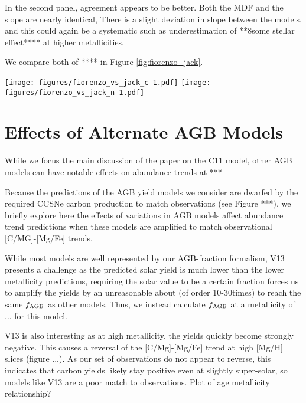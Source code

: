 \documentclass[fleqn,usenatbib]{mnras}
\begin{document}
In the second panel, agreement appears to be better. Both the MDF and the slope are nearly identical,
There is a slight deviation in slope between the models, and this could again be a systematic such as underestimation of **8some stellar effect**** at higher metallicities.

We compare both of **** in Figure \ref{fig:fiorenzo_jack}.


\begin{figure*}
    \centering
    \texttt{[image: figures/fiorenzo\_vs\_jack\_c-1.pdf]}
    \texttt{[image: figures/fiorenzo\_vs\_jack\_n-1.pdf]}
    \caption{A comparison of estimated stellar birth abundance trends from the subgiant sample and \citet{2021arXiv210603912V}
    }
    \label{fig:fiorenzo_jack}
\end{figure*}

\section{Effects of Alternate AGB Models}\label{sec:alt_agb}


While we focus the main discussion of the paper on the C11 model, other AGB models can have notable effects on abundance trends at ***

Because the predictions of the AGB yield models we consider are dwarfed by the required CCSNe carbon production to match observations (see Figure ***), we briefly explore here the effects of variations in AGB models affect abundance trend predictions when these models are amplified to match observational [C/MG]-[Mg/Fe] trends. 

While most models are well represented by our AGB-fraction formalism, V13 presents a challenge as the predicted solar yield is much lower than the lower metallicity predictions, requiring the solar value to be a certain fraction forces us to amplify the yields by an unreasonable about (of order 10-30times) to reach the same $f_{\rm AGB}$ as other models. Thus, we instead calculate $f_{\rm AGB}$ at a metallicity of ... for this model. 

V13 is also interesting as at high metallicity, the yields quickly become strongly negative. This causes a reversal of the [C/Mg]-[Mg/Fe] trend at high [Mg/H] slices (figure ...). As our set of observations do not appear to reverse, this indicates that carbon yields likely stay positive even at slightly super-solar, so models like V13 are a poor match to observations. 
Plot of age metallicity relationship?
\end{document}
